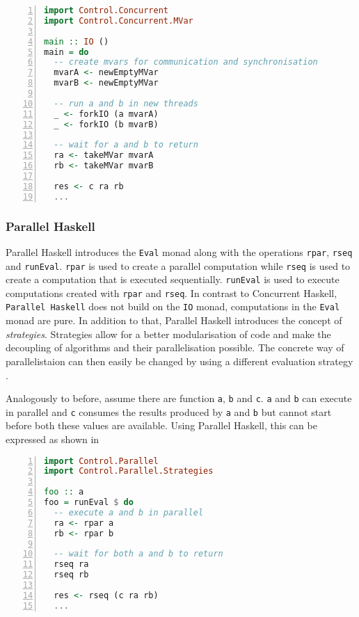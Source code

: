 \begin{lstlisting}[language=Haskell, numbers=left, frame=bt, label=lst:example_concurrent_haskell, caption={Parallel and sequential composition in \textsf{Concurrent Haskell}.}]
import Control.Concurrent
import Control.Concurrent.MVar

main :: IO ()
main = do
  -- create mvars for communication and synchronisation
  mvarA <- newEmptyMVar
  mvarB <- newEmptyMVar  
  
  -- run a and b in new threads
  _ <- forkIO (a mvarA)
  _ <- forkIO (b mvarB)  
  
  -- wait for a and b to return
  ra <- takeMVar mvarA
  rb <- takeMVar mvarB
  
  res <- c ra rb
  ...
\end{lstlisting}

\subsubsection{Parallel Haskell}
\textsf{Parallel Haskell} introduces the \texttt{Eval} monad along with the operations \texttt{rpar}, \texttt{rseq} and \texttt{runEval}. \texttt{rpar} is used to create a parallel computation while \texttt{rseq} is used to create a computation that is executed sequentially. \texttt{runEval} is used to execute computations created with \texttt{rpar} and \texttt{rseq}. In contrast to \textsf{Concurrent Haskell}, \texttt{Parallel Haskell} does not build on the \texttt{IO} monad, computations in the \texttt{Eval} monad are pure. In addition to that, \textsf{Parallel Haskell} introduces the concept of \textit{strategies}. Strategies allow for a better modularisation of code and make the decoupling of algorithms and their parallelisation possible. The concrete way of parallelistaion can then easily be changed by using a different evaluation strategy \cite{Marlow}.

Analogously to before, assume there are function \texttt{a}, \texttt{b} and \texttt{c}. \texttt{a} and \texttt{b} can execute in parallel and \texttt{c} consumes the results produced by \texttt{a} and \texttt{b} but cannot start before both these values are available. Using \textsf{Parallel Haskell}, this can be expressed as shown in 
\begin{lstlisting}[language=Haskell, numbers=left, frame=bt, label=lst:example_parallel_haskell, caption={Parallel and sequential composition in \textsf{Parallel Haskell}.}]
import Control.Parallel
import Control.Parallel.Strategies

foo :: a
foo = runEval $ do
  -- execute a and b in parallel
  ra <- rpar a
  rb <- rpar b
  
  -- wait for both a and b to return
  rseq ra
  rseq rb
  
  res <- rseq (c ra rb)
  ...
\end{lstlisting}